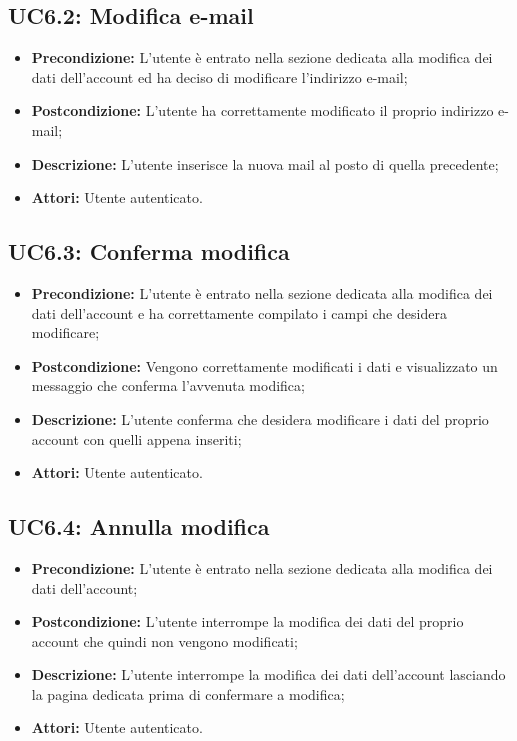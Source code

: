 \subsection{ UC6.2: Modifica e-mail}

\begin{itemize}
	\item \textbf{Precondizione:} L’utente è entrato nella sezione dedicata alla modifica dei dati dell’account ed ha deciso di modificare l’indirizzo e-mail;
	\item \textbf{Postcondizione:} L’utente ha correttamente modificato il proprio indirizzo e-mail;
	\item \textbf{Descrizione:} L’utente inserisce la nuova mail al posto di quella precedente;
	\item \textbf{Attori:} Utente autenticato.
\end{itemize}
\subsection{ UC6.3: Conferma modifica}

\begin{itemize}
	\item \textbf{Precondizione:} L’utente è entrato nella sezione dedicata alla modifica dei dati dell’account e ha correttamente compilato i campi che desidera modificare;
	\item \textbf{Postcondizione:} Vengono correttamente modificati i dati e visualizzato un messaggio che conferma l’avvenuta modifica;
	\item \textbf{Descrizione:} L’utente conferma che desidera modificare i dati del proprio account con quelli appena inseriti;
	\item \textbf{Attori:} Utente autenticato.
\end{itemize}
\subsection{ UC6.4: Annulla modifica}

\begin{itemize}
	\item \textbf{Precondizione:} L’utente è entrato nella sezione dedicata alla modifica dei dati dell’account;
	\item \textbf{Postcondizione:} L’utente interrompe la modifica dei dati del proprio account che quindi non vengono modificati;
	\item \textbf{Descrizione:} L’utente interrompe la modifica dei dati dell’account lasciando la pagina dedicata prima di confermare a modifica;
	\item \textbf{Attori:} Utente autenticato.
\end{itemize}
